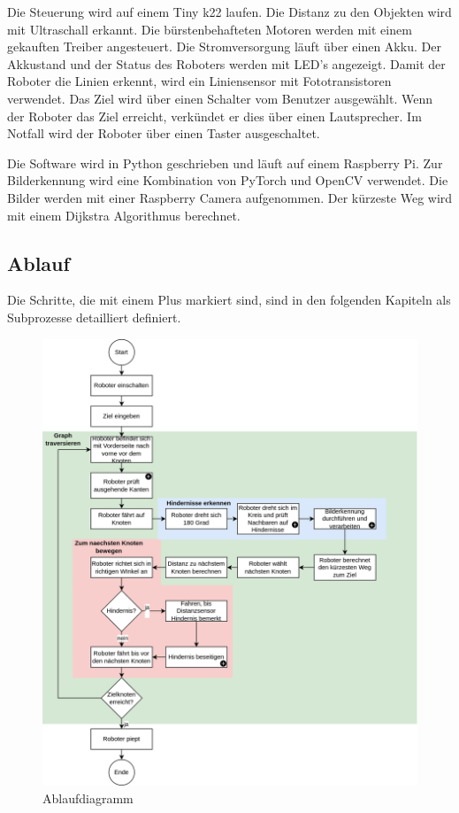 Die Steuerung wird auf einem Tiny k22 laufen. Die Distanz zu den Objekten wird mit Ultraschall erkannt. Die bürstenbehafteten Motoren werden mit einem gekauften Treiber angesteuert. Die Stromversorgung läuft über einen Akku. Der Akkustand und der Status des Roboters werden mit LED's angezeigt. Damit der Roboter die Linien erkennt, wird ein Liniensensor mit Fototransistoren verwendet. Das Ziel wird über einen Schalter vom Benutzer ausgewählt.
Wenn der Roboter das Ziel erreicht, verkündet er dies über einen Lautsprecher. Im Notfall wird der Roboter über einen Taster ausgeschaltet.

Die Software wird in Python geschrieben und läuft auf einem Raspberry Pi. Zur Bilderkennung wird eine Kombination von PyTorch und OpenCV verwendet. Die Bilder werden mit einer Raspberry Camera aufgenommen. Der kürzeste Weg wird mit einem Dijkstra Algorithmus berechnet.


\subsection{Ablauf}

Die Schritte, die mit einem Plus markiert sind, sind in den folgenden Kapiteln als Subprozesse detailliert definiert.

\begin{figure}[H]
\centering
\includegraphics[width=\textwidth]{assets/gesamtkonzept/ablaufdiagramm.png}
\caption{Ablaufdiagramm}
\label{fig:ablaufdiagramm}
\end{figure}

